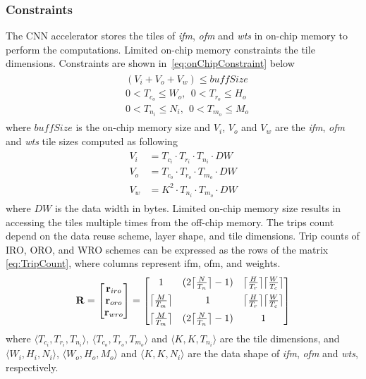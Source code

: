 \documentclass[a4paper,10pt]{article}
\DeclarePairedDelimiter{\ceil}{\lceil}{\rceil}
\newcommand{\dataWidth}{DW}
\newcommand{\BuffSize}{buffSize}
\begin{document}
\subsubsection{Constraints}
The CNN accelerator stores the tiles of \textit{ifm}, \textit{ofm} and \textit{wts} in on-chip memory to perform the computations. Limited on-chip memory constraints the tile dimensions. Constraints are shown in~\eqref{eq:onChipConstraint} below
\begin{align}\label{eq:onChipConstraint}
	\begin{split}
		&(V_{i}{+}V_{o}{+}V_{w})\leq \BuffSize \\
		&0<T_{c_o}\leq W_o,~\ 0<T_{r_o}\leq H_o\\
		&0<T_{n_i}\leq N_i,~\ 0<T_{m_o}\leq M_o
	\end{split}
\end{align}
where $\BuffSize$ is the on-chip memory size and $V_{i}$, $V_{o}$ and $V_{w}$ are the \textit{ifm}, \textit{ofm} and \textit{wts} tile sizes computed as following 
\begin{align}\label{eq:tilesVol}
	\begin{split}
		V_{i}&=T_{c_i}{\cdot} T_{r_i}{\cdot} T_{n_i}{\cdot}\dataWidth\\
		V_{o}&=T_{c_o}{\cdot} T_{r_o}{\cdot} T_{m_o}{\cdot}\dataWidth\\
		V_{w}&=K^2{\cdot} T_{n_i}{\cdot} T_{m_o}{\cdot}\dataWidth
	\end{split}
\end{align}
where $\dataWidth$ is the data width in bytes. Limited on-chip memory size results in accessing the tiles multiple times from the off-chip memory.  The trips count depend on the data reuse scheme, layer shape, and tile dimensions. Trip counts of IRO, ORO, and WRO schemes can be expressed as the rows of the matrix \eqref{eq:TripCount}, where columns represent ifm, ofm, and weights.
\begin{align}\label{eq:TripCount}
	\mathbf{R}=
	\begin{bmatrix}
		\mathbf{r}_{iro} \\  \mathbf{r}_{oro} \\ \mathbf{r}_{wro} \\
	\end{bmatrix}= 
	\begin{bmatrix}
		1  & (2\ceil[\big]{\frac{N}{T_n}}-1) & \ceil[\big]{\frac{H}{T_r}} \ceil[\big]{\frac{W}{T_c}}\\[6pt]
		\ceil[\big]{\frac{M}{T_m}} & 1 & \ceil[\big]{\frac{H}{T_r}} \ceil[\big]{\frac{W}{T_c}}\\[6pt]
		\ceil[\big]{\frac{M}{T_m}} & (2\ceil[\big]{\frac{N}{T_n}}-1) & 1\\
	\end{bmatrix}
\end{align}
where $\langle T_{c_i},T_{r_i},T_{n_i}\rangle$, $\langle T_{c_o},T_{r_o},T_{m_o}\rangle$ and $\langle K,K,T_{n_i}\rangle$ are the tile dimensions, and $\langle W_i,H_i,N_i\rangle$, $\langle W_o,H_o,M_o\rangle$ and $\langle K,K,N_i\rangle$ are the data shape of \textit{ifm}, \textit{ofm} and \textit{wts}, respectively. 
\end{document}
